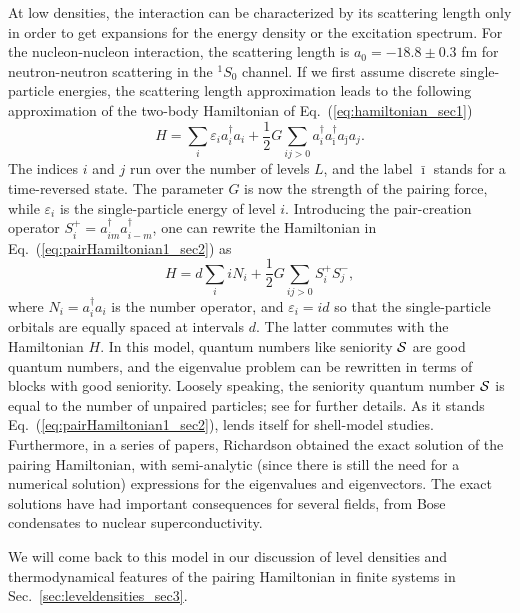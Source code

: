 \documentclass[rmp,preprint,aps,floatfix]{revtex4}
\begin{document}
At low densities, the interaction can be characterized by its 
scattering length only in order to get expansions for the energy
density or the excitation spectrum. For the nucleon-nucleon
interaction, the 
scattering length is 
$a_0=-18.8\pm 0.3$ fm for  
neutron-neutron scattering in the $^1S_0$ channel.
If we first assume discrete single-particle
energies, 
the scattering length approximation leads to the following
approximation of the two-body
Hamiltonian of Eq.~(\ref{eq:hamiltonian_sec1}) 
\begin{equation}
   H=\sum_i \varepsilon_i a^{\dagger}_i a_i +\frac{1}{2} G\sum_{ij>0}
           a^{\dagger}_{i}
     a^{\dagger}_{\bar{\imath}}a_{\bar{\jmath}}a_{j}.
     \label{eq:pairHamiltonian1_sec2}
\end{equation}
The indices $i$ and $j$ run 
over the number of levels $L$, and the label $\bar{\imath}$ stands 
for a time-reversed state. The parameter $G$ is now the 
strength of the pairing force, while $\varepsilon_i$ is the single-particle 
energy of level $i$. 
Introducing the pair-creation operator 
$S^+_i=a^{\dagger}_{im}a^{\dagger}_{i-m}$,
one can rewrite the Hamiltonian in 
Eq.\ (\ref{eq:pairHamiltonian1_sec2}) as
\begin{equation}
   H=d\sum_iiN_i+
     \frac{1}{2} G\sum_{ij>0}S^+_iS^-_j,
     \label{eq:pairH2_sec}
\end{equation}
where  $N_i=a^{\dagger}_i a_i$
is the number operator, and 
$\varepsilon_i = id$ so that the single-particle orbitals 
are equally spaced at intervals $d$. The latter commutes with the 
Hamiltonian $H$. In this model, quantum numbers like seniority 
$\cal{S}$ are good quantum numbers, and the eigenvalue problem 
can be rewritten in terms of blocks with good seniority. Loosely 
speaking, the seniority quantum number $\cal{S}$ is equal to 
the number of unpaired particles; see  \cite{talmi93} for 
further details. As it stands 
Eq.~(\ref{eq:pairHamiltonian1_sec2}), lends itself for shell-model
studies. 
Furthermore, in  a series of papers, Richardson 
\cite{richardson1,richardson2,richardson3,richardson4,richardson5,richardson6,richardson7} obtained the exact solution of the pairing Hamiltonian, with 
semi-analytic (since there is still the need for a numerical solution) 
expressions for the eigenvalues and eigenvectors. The exact solutions
have had important consequences for several fields, from Bose condensates to
nuclear superconductivity.
 
We will come back to this model 
in our discussion of level densities
and thermodynamical features of the pairing Hamiltonian in
finite systems in Sec.~\ref{sec:leveldensities_sec3}. 
\end{document}
